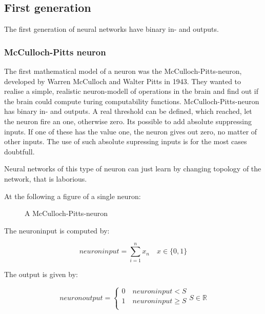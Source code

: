 \documentclass[10pt,a4paper,DIV=11]{scrreprt}
\begin{document}
\subsection{First generation}
The first generation of neural networks have binary in- and outputs.

\subsubsection{McCulloch-Pitts neuron}
The first mathematical model of a neuron was the McCulloch-Pitts-neuron,
developed by Warren McCulloch and Walter Pitts in 1943.
They wanted to realise a simple, realistic neuron-modell of operations in the brain and find out if the brain could compute turing computability functions.
McCulloch-Pitts-neuron has binary in- and outputs.
A real threshold can be defined, which reached, let the neuron fire an one, otherwise zero.
Its possible to add absolute suppressing inputs. If one of these has the value one, the neuron gives out zero, no matter of other inputs. The use of such absolute supressing inputs is for the most cases doubtfull.


Neural networks of this type of neuron can just learn by changing topology of the network, that is laborious.

At the following a figure of a single neuron:

\begin{figure}[H]  %
	\centering
	\caption{A McCulloch-Pitts-neuron}
	\label{fig:pitts1}
\end{figure}
The neuroninput is computed by:

\begin{equation}
	neuroninput = \sum_{i=1}^{n} x_{n} \quad  x \in \{0, 1\}
\end{equation}

The output is given by:

\begin{equation}
	neuronoutput=\begin{cases}
		0 \quad  neuroninput < S \\  %
		1 \quad  neuroninput \geq S \\
	\end{cases}
	S \in \mathbb{R}
\end{equation}
\end{document}
